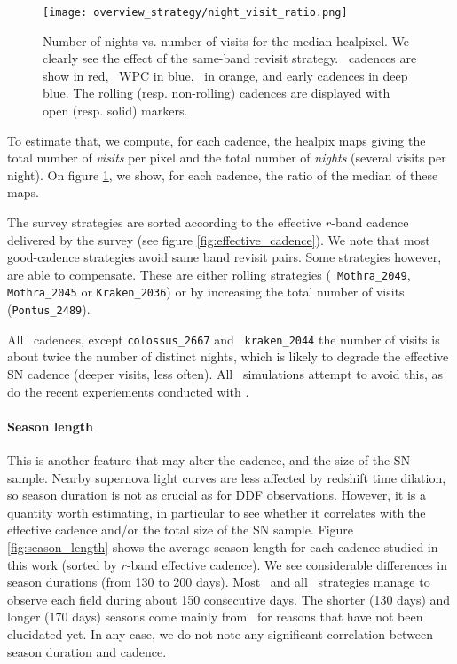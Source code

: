 \begin{figure}
  \begin{center}
    \texttt{[image: overview\_strategy/night\_visit\_ratio.png]}
    \caption{Number of nights vs. number of visits for the median
      healpixel. We clearly see the effect of the same-band revisit
      strategy.  \altsched~cadences are show in red, \opsim~WPC in
      blue, \slair~in orange, and early cadences in deep blue. The
      rolling (resp. non-rolling) cadences are displayed with open
      (resp. solid) markers. }
    \label{fig:effective_number_of_visits}
  \end{center}
\end{figure}

To estimate that, we compute, for each cadence, the healpix maps
giving the total number of {\em visits} per pixel and the total number
of {\em nights} (several visits per night).  On figure
\ref{fig:effective_number_of_visits}, we show, for each cadence, the
ratio of the median of these maps.  

The survey strategies are sorted according to the effective $r$-band
cadence delivered by the survey (see figure
\ref{fig:effective_cadence}).  We note that most good-cadence
strategies avoid same band revisit pairs. Some strategies however, are
able to compensate.  These are either rolling strategies ({\tt
  Mothra\_2049}, {\tt Mothra\_2045} or {\tt Kraken\_2036}) or by
increasing the total number of visits ({\tt Pontus\_2489}).

All \opsim~cadences, except {\tt colossus\_2667} and {\tt
  kraken\_2044} the number of visits is about twice the number of
distinct nights, which is likely to degrade the effective SN cadence
(deeper visits, less often).  All \altsched~simulations attempt to
avoid this, as do the recent experiements conducted with \slair.

\paragraph{Season length} This is another feature that may alter the cadence, and the size of the SN sample.
Nearby supernova light curves are less
affected by redshift time dilation, so season duration is not as
crucial as for DDF observations.  However, it is a quantity worth
estimating, in particular to see whether it correlates with the
effective cadence and/or the total size of the SN sample.
Figure \ref{fig:season_length} shows the average season length for
each cadence studied in this work (sorted by $r$-band effective
cadence).  We see considerable differences in season durations (from 130 to 200 days).
Most \opsim~and all \altsched~strategies manage to observe each field during about
150 consecutive days. The shorter (130 days) and longer (170 days) seasons come mainly from  \slair~for reasons that have not been elucidated yet. In any case, we do not
note any significant correlation between season duration and cadence.

